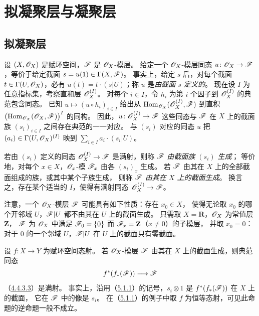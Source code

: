 
\par

\section{拟凝聚层与凝聚层}\hypertarget{heading:0:5}{}
\subsection{拟凝聚层}\hypertarget{heading:0:5.1}{}

设 $(X,\mathscr O_X)$ 是赋环空间，$\mathscr F$ 是 $\mathscr O_X$-模层。
给定一个 $\mathscr O_X$-模层同态 $u\colon\mathscr O_X\to\mathscr F$，等价于给定截面
$s=u(1)\in\Gamma(X,\mathscr F)$。
事实上，给定 $s$ 后，对每个截面 $t\in\Gamma(U,\mathscr O_X)$，必有
$u(t)=t\cdot(s|U)$；称 $u$ 是\emph{由截面 $s$ 定义的}。
现在设 $I$ 为任意指标集，考察直和层 $\mathscr O_X^{(I)}$。
对每个 $i\in I$，令 $h_i$ 为第 $i$ 个因子到 $\mathscr O_X^{(I)}$ 的典范包含同态。
已知 $u\mapsto(u\circ h_i)_{i\in I}$ 给出从
$\operatorname{Hom}_{\mathscr O_X}(\mathscr O_X^{(I)},\mathscr F)$ 到直积
$\bigl(\operatorname{Hom}_{\mathscr O_X}(\mathscr O_X,\mathscr F)\bigr)^I$ 的同构。
因此，$u\colon\mathscr O_X^{(I)}\to\mathscr F$ 这些同态与 $\mathscr F$ 在 $X$ 上的截面族
$(s_i)_{i\in I}$ 之间存在典范的一一对应。
与 $(s_i)$ 对应的同态 $u$ 把
$(a_i)\in\Gamma(U,\mathscr O_X)^{(I)}$ 映到 $\sum_{i\in I}a_i\cdot(s_i|U)$。

若由 $(s_i)$ 定义的同态 $\mathscr O_X^{(I)}\to\mathscr F$ 是满射，则称 $\mathscr F$ \emph{由截面族 $(s_i)$ 生成}；
等价地，对每个 $x\in X$，$\mathscr O_x$-模 $\mathscr F_x$ 由各 $(s_i)_x$ 生成。
若 $\mathscr F$ 由其在 $X$ 上的全部截面组成的族，或其中某个子族生成，
则称 $\mathscr F$ \emph{由其在 $X$ 上的截面生成}。
换言之，存在某个适当的 $I$，使得有满射同态 $\mathscr O_X^{(I)}\to\mathscr F$。

注意，一个 $\mathscr O_X$-模层 $\mathscr F$ 可能具有如下性质：存在 $x_0\in X$，
使得无论取 $x_0$ 的哪个开邻域 $U$，$\mathscr F|U$ 都不由其在 $U$ 上的截面生成。
只需取 $X=\mathbf R$，$\mathscr O_X$ 为常值层 $\mathbf Z$，
$\mathscr F$ 为 $\mathscr O_X$ 中满足 $\mathscr F_0=\{0\}$ 而 $\mathscr F_x=\mathbf Z$（$x\ne0$）的子模层，
并取 $x_0=0$：对于 $0$ 的一个邻域 $U$，$\mathscr F|U$ 在 $U$ 上的截面只有零截面。

设 $f\colon X\to Y$ 为赋环空间态射。
若 $\mathscr O_X$-模层 $\mathscr F$ 由其在 $X$ 上的截面生成，则典范同态
\[
 f^*(f_*(\mathscr F))\longrightarrow\mathscr F
\]
（\hyperref[eq:0:4.4.3.3]{4.4.3.3}）是满射。
事实上，沿用（\hyperlink{para:0:5.1.1}{5.1.1}）的记号，$s_i\otimes1$ 是 $f^*(f_*(\mathscr F))$ 在 $X$ 上的截面，
它在 $\mathscr F$ 中的像是 $s_i$。
在（\hyperlink{para:0:5.1.1}{5.1.1}）的例子中取 $f$ 为恒等态射，可见此命题的逆命题一般不成立。


